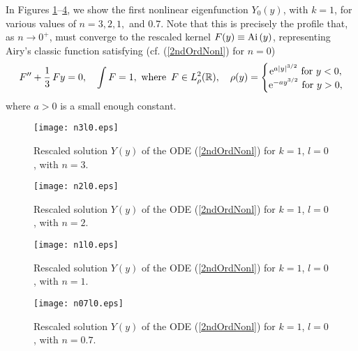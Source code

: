 \documentclass[12pt]{amsart}
\begin{document}
In Figures \ref{F1}--\ref{F4}, we show the first nonlinear
eigenfunction $Y_0(y)$, with $k=1$, for various values of $n=3, 2,
1,$ and $0.7$. Note that this is precisely the profile that, as $n
\to 0^+$, must converge to the rescaled kernel $F(y) \equiv {\rm
Ai}\,(y)$, representing
 Airy's classic function satisfying (cf.
 (\ref{2ndOrdNonl}) for $n=0$)
  \begin{equation}
  \label{Ai1}
   {\textstyle}{
  F''+ \frac 13\, F y=0, \quad \int F =1,
  }
  \,\,\, \mbox{where} \,\,\, F \in L^2_\rho({\mathbb{R}}), \quad \rho(y)=
  \left\{
   \begin{matrix}
    {\mathrm e}^{a|y|^{3/2}} \,\, \mbox{for} \,\,y<0,\\
{\mathrm e}^{-a y^{3/2}} \,\, \mbox{for} \,\,y>0,
 \end{matrix}
  \right.
 \end{equation}
 where $a>0$ is a small enough constant.

\begin{figure}[htbp]
\begin{center}
\texttt{[image: n3l0.eps]}
\caption{\small Rescaled solution $Y(y)$ of the ODE
(\ref{2ndOrdNonl}) for $k=1$, $l=0$,  with $n=3$.}
 \label{F1}
\end{center}
\end{figure}

\begin{figure}[htbp]
\begin{center}
\texttt{[image: n2l0.eps]}
\caption{\small Rescaled solution $Y(y)$ of the ODE
(\ref{2ndOrdNonl}) for $k=1$, $l=0$,  with $n=2$.}
 \label{F2}
\end{center}
\end{figure}

\begin{figure}[htbp]
\begin{center}
\texttt{[image: n1l0.eps]}
\caption{\small Rescaled solution $Y(y)$ of the ODE
(\ref{2ndOrdNonl}) for $k=1$, $l=0$,  with $n=1$.}
 \label{F3}
\end{center}
\end{figure}

\begin{figure}[htbp]
\begin{center}
\texttt{[image: n07l0.eps]}
\caption{\small Rescaled solution $Y(y)$ of the ODE
(\ref{2ndOrdNonl}) for $k=1$, $l=0$, with $n=0.7$.}
 \label{F4}
\end{center}
\end{figure}
\end{document}
